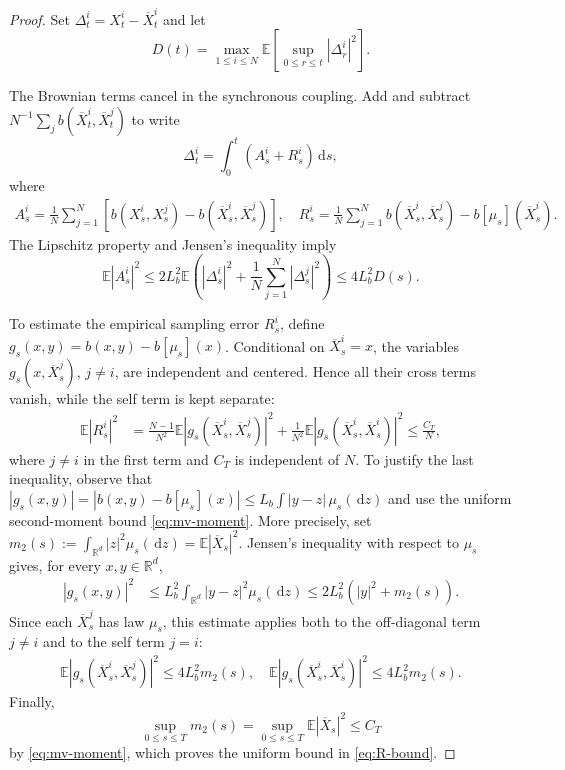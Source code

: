\documentclass[11pt]{amsart}
\numberwithin{equation}{section}
\theoremstyle{plain}
\newcommand{\R}{\mathbb{R}}
\newcommand{\E}{\mathbb{E}}
\newcommand{\dd}{\,\mathrm{d}}
\newcommand{\abs}[1]{\left\lvert#1\right\rvert}
\begin{document}
\begin{proof}
Set $\Delta_t^i=X_t^i-\overline X_t^i$ and let
\[
 D(t)=\max_{1\leq i\leq N}
 \E\left[\sup_{0\leq r\leq t}\abs{\Delta_r^i}^2\right].
\]

The Brownian terms cancel in the
synchronous coupling.  Add and subtract
$N^{-1}\sum_j b(\overline X_t^i,\overline X_t^j)$ to write
\begin{equation}\label{eq:coupling-error-decomposition}
 \Delta_t^i=\int_0^t\left(A_s^i+R_s^i\right)\dd s,
\end{equation}
where
\begin{align*}
 A_s^i=\frac1N\sum_{j=1}^N
 \left[b(X_s^i,X_s^j)-b(\overline X_s^i,\overline X_s^j)\right],\quad 
 R_s^i=\frac1N\sum_{j=1}^N b(\overline X_s^i,\overline X_s^j)
       -b[\mu_s](\overline X_s^i).
\end{align*}
The Lipschitz property and Jensen's inequality imply
\begin{equation}\label{eq:A-bound}
 \E \abs{A_s^i}^2
 \leq 2L_b^2\E \left(\abs{\Delta_s^i}^2
       +\frac1N\sum_{j=1}^N\abs{\Delta_s^j}^2\right) \leq4L_b^2D(s).
\end{equation}



To estimate the empirical sampling error $R_s^i$, define
$g_s(x,y)=b(x,y)-b[\mu_s](x)$.  Conditional on
$\overline X_s^i=x$, the variables
$g_s(x,\overline X_s^j)$, $j\ne i$, are independent and centered.  Hence all
their cross terms vanish, while the self term is kept separate:
\begin{align}
 \E\abs{R_s^i}^2
 &=\frac{N-1}{N^2}
   \E\abs{g_s(\overline X_s^i,\overline X_s^j)}^2
   +\frac1{N^2}
   \E\abs{g_s(\overline X_s^i,\overline X_s^i)}^2
 \leq \frac{C_T}{N}, \label{eq:R-bound}
\end{align}
where $j\ne i$ in the first term and $C_T$ is independent of $N$. 
To justify the last inequality, observe that $ \abs{g_s(x,y)} = \abs{b(x,y)-b[\mu_s](x)} 
 \leq L_b\int\abs{y-z}\,\mu_s(\dd z)$ 
and use the uniform second-moment bound \eqref{eq:mv-moment}.  More precisely,
set $ m_2(s):=\int_{\R^d}\abs{z}^2\mu_s(\dd z)
       =\E\abs{\overline X_s}^2$. 
Jensen's inequality with respect to $\mu_s$ gives, for every $x,y\in\R^d$,
\begin{align*}
 \abs{g_s(x,y)}^2
 &\leq L_b^2\int_{\R^d}\abs{y-z}^2\mu_s(\dd z) \leq 2L_b^2\left(\abs{y}^2+m_2(s)\right).
\end{align*}
Since each $\overline X_s^j$ has law $\mu_s$, this estimate applies both to
the off-diagonal term $j\ne i$ and to the self term $j=i$:
\begin{align*}
 \E\abs{g_s(\overline X_s^i,\overline X_s^j)}^2  \leq4L_b^2m_2(s),\quad 
 \E\abs{g_s(\overline X_s^i,\overline X_s^i)}^2  \leq4L_b^2m_2(s).
\end{align*}
Finally, 
\[
 \sup_{0\leq s\leq T}m_2(s) = \sup_{0\leq s\leq T}\E\abs{\overline X_s}^2
 \leq C_T
\]
by \eqref{eq:mv-moment}, which proves the uniform bound in
\eqref{eq:R-bound}.




\end{proof}
\end{document}
